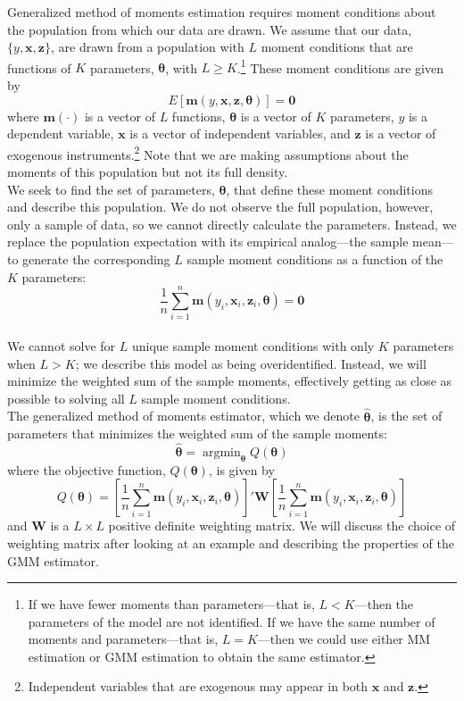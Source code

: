 \documentclass[11pt,letterpaper]{article}
\DeclareMathOperator*{\argmin}{argmin}
\begin{document}
\noindent Generalized method of moments estimation requires moment conditions about the population from which our data are drawn. We assume that our data, $\{y, \bm{x}, \bm{z}\}$, are drawn from a population with $L$ moment conditions that are functions of $K$ parameters, $\bm{\theta}$, with $L \geq K$.\footnote{If we have fewer moments than parameters---that is, $L < K$---then the parameters of the model are not identified. If we have the same number of moments and parameters---that is, $L = K$---then we could use either MM estimation or GMM estimation to obtain the same estimator.} These moment conditions are given by
$$E[\bm{m}(y, \bm{x}, \bm{z}, \bm{\theta})] = \bm{0}$$
where $\bm{m}(\cdot)$ is a vector of $L$ functions, $\bm{\theta}$ is a vector of $K$ parameters, $y$ is a dependent variable, $\bm{x}$ is a vector of independent variables, and $\bm{z}$ is a vector of exogenous instruments.\footnote{Independent variables that are exogenous may appear in both $\bm{x}$ and $\bm{z}$.} Note that we are making assumptions about the moments of this population but not its full density. \\

\noindent We seek to find the set of parameters, $\bm{\theta}$, that define these moment conditions and describe this population. We do not observe the full population, however, only a sample of data, so we cannot directly calculate the parameters. Instead, we replace the population expectation with its empirical analog---the sample mean---to generate the corresponding $L$ sample moment conditions as a function of the $K$ parameters:
$$\frac{1}{n} \sum_{i = 1}^n \bm{m}(y_i, \bm{x}_i, \bm{z}_i, \bm{\theta}) = \bm{0}$$ \\
We cannot solve for $L$ unique sample moment conditions with only $K$ parameters when $L > K$; we describe this model as being overidentified. Instead, we will minimize the weighted sum of the sample moments, effectively getting as close as possible to solving all $L$ sample moment conditions. \\

\noindent The generalized method of moments estimator, which we denote $\widehat{\bm{\theta}}$, is the set of parameters that minimizes the weighted sum of the sample moments:
$$\widehat{\bm{\theta}} = \argmin_{\bm{\theta}} Q(\bm{\theta})$$
where the objective function, $Q(\bm{\theta})$, is given by
$$Q(\bm{\theta}) = \left[ \frac{1}{n} \sum_{i = 1}^n \bm{m}(y_i, \bm{x}_i, \bm{z}_i, \bm{\theta}) \right]' \bm{W} \left[ \frac{1}{n} \sum_{i = 1}^n \bm{m}(y_i, \bm{x}_i, \bm{z}_i, \bm{\theta}) \right]$$
and $\bm{W}$ is a $L \times L$ positive definite weighting matrix. We will discuss the choice of weighting matrix after looking at an example and describing the properties of the GMM estimator.
\end{document}
